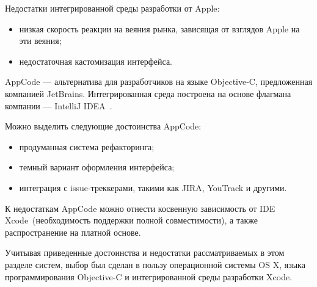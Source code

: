 Недостатки интегрированной среды разработки от Apple:
\begin{itemize}
  \item низкая скорость реакции на веяния рынка, зависящая от взглядов Apple
    на эти веяния;
  \item недостаточная кастомизация интерфейса.
\end{itemize}

AppCode --- альтернатива для разработчиков на языке Objective-C, предложенная
компанией JetBrains. Интегрированная среда построена на основе флагмана
компании --- IntelliJ IDEA~\cite{appcode_ide}.

Можно выделить следующие достоинства AppCode:

\begin{itemize}
  \item продуманная система рефакторинга;
  \item темный вариант оформления интерфейса;
  \item интеграция с issue-треккерами, такими как JIRA, YouTrack и другими.
\end{itemize}

К недостаткам AppCode можно отнести косвенную зависимость от
IDE Xcode~(необходимость поддержки полной совместимости), а также распространение
на платной основе.

Учитывая приведенные достоинства и недостатки рассматриваемых в этом разделе
систем, выбор был сделан в пользу операционной системы OS X, языка программирования
Objective-C и интегрированной среды разработки Xcode.

\pagebreak
